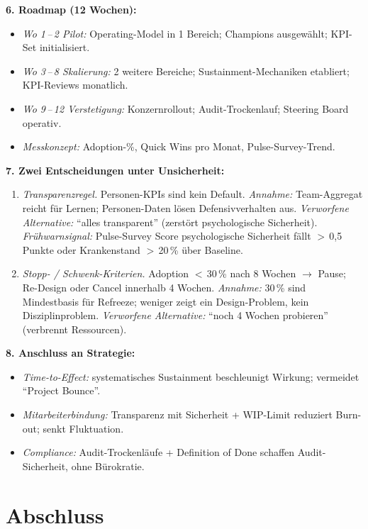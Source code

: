 \documentclass[11pt,a4paper,oneside]{article}
\begin{document}
\begin{loesungbox}
\smallskip
\textbf{6. Roadmap (12 Wochen):}
\begin{itemize}
  \item \emph{Wo 1\,--\,2 Pilot:} Operating-Model in 1 Bereich; Champions ausgew\"ahlt; KPI-Set initialisiert.
  \item \emph{Wo 3\,--\,8 Skalierung:} 2 weitere Bereiche; Sustainment-Mechaniken etabliert; KPI-Reviews monatlich.
  \item \emph{Wo 9\,--\,12 Verstetigung:} Konzernrollout; Audit-Trockenlauf; Steering Board operativ.
  \item \emph{Messkonzept:} Adoption-\%, Quick Wins pro Monat, Pulse-Survey-Trend.
\end{itemize}

\smallskip
\textbf{7. Zwei Entscheidungen unter Unsicherheit:}
\begin{enumerate}
  \item \emph{Transparenzregel.} Personen-KPIs sind kein Default. \emph{Annahme:} Team-Aggregat reicht f\"ur Lernen; Personen-Daten l\"osen Defensivverhalten aus. \emph{Verworfene Alternative:} ``alles transparent'' (zerst\"ort psychologische Sicherheit). \emph{Fr\"uhwarnsignal:} Pulse-Survey Score psychologische Sicherheit f\"allt $>$\,0,5 Punkte oder Krankenstand $>$\,20\,\% \"uber Baseline.
  \item \emph{Stopp- / Schwenk-Kriterien.} Adoption $<$\,30\,\% nach 8 Wochen $\rightarrow$ Pause; Re-Design oder Cancel innerhalb 4 Wochen. \emph{Annahme:} 30\,\% sind Mindestbasis f\"ur Refreeze; weniger zeigt ein Design-Problem, kein Disziplinproblem. \emph{Verworfene Alternative:} ``noch 4 Wochen probieren'' (verbrennt Ressourcen).
\end{enumerate}

\smallskip
\textbf{8. Anschluss an Strategie:}
\begin{itemize}
  \item \emph{Time-to-Effect:} systematisches Sustainment beschleunigt Wirkung; vermeidet ``Project Bounce''.
  \item \emph{Mitarbeiterbindung:} Transparenz mit Sicherheit + WIP-Limit reduziert Burn-out; senkt Fluktuation.
  \item \emph{Compliance:} Audit-Trockenl\"aufe + Definition of Done schaffen Audit-Sicherheit, ohne B\"urokratie.
\end{itemize}
\end{loesungbox}

\clearpage

\section*{Abschluss}
\thispagestyle{plain}
\end{document}
